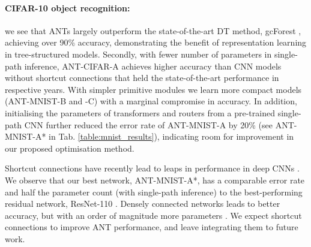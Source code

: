 \paragraph{CIFAR-10 object recognition:} we see that ANTs largely outperform the state-of-the-art DT method, gcForest \cite{zhou2017deepft}, achieving over 90\% accuracy, demonstrating the benefit of representation learning in tree-structured models. Secondly, with fewer number of parameters in single-path inference, ANT-CIFAR-A achieves higher accuracy than CNN models without shortcut connections \cite{goodfellow2013maxout,lin2013network,springenberg2014striving} that held the state-of-the-art performance in respective years. With simpler primitive modules we learn more compact models (ANT-MNIST-B and -C) with a marginal compromise in accuracy. In addition, initialising the parameters of transformers and routers from a pre-trained single-path CNN further reduced the error rate of ANT-MNIST-A by 20\% (see ANT-MNIST-A* in Tab. \ref{table:mnist_results}), indicating room for improvement in our proposed optimisation method.

Shortcut connections \cite{fahlman1990cascade} have recently lead to leaps in performance in deep CNNs \cite{he2016deep,huang2017densely}. We observe that our best network, ANT-MNIST-A*, has a comparable error rate and half the parameter count (with single-path inference) to the best-performing residual network, ResNet-110 \cite{he2016deep}. Densely connected networks leads to better accuracy, but with an order of magnitude more parameters \cite{huang2017densely}. We expect shortcut connections to improve ANT performance, and leave integrating them to future work.


